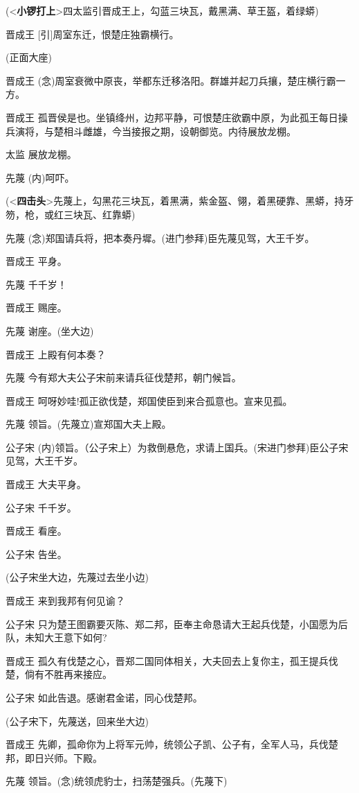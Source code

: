 (\textless{}\textbf{小锣打上}\textgreater{}四太监引晋成王上，勾蓝三块瓦，戴黑满、草王盔，着绿蟒)

晋成王 {[}引{]}周室东迁，恨楚庄独霸横行。

(正面大座)

晋成王
(念)周室衰微中原丧，举都东迁移洛阳。群雄并起刀兵攘，楚庄横行霸一方。

晋成王
孤晋侯是也。坐镇绛州，边邦平静，可恨楚庄欲霸中原，为此孤王每日操兵演将，与楚相斗雌雄，今当接报之期，设朝御览。内待展放龙棚。

太监 展放龙棚。

先蔑 (内)呵吓。

(\textless{}\textbf{四击头}\textgreater{}先蔑上，勾黑花三块瓦，着黑满，紫金盔、翎，着黑硬靠、黑蟒，持牙笏，枪，或红三块瓦、红靠蟒)

先蔑 (念)郑国请兵将，把本奏丹墀。(进门参拜)臣先蔑见驾，大王千岁。

晋成王 平身。

先蔑 千千岁！

晋成王 赐座。

先蔑 谢座。(坐大边)

晋成王 上殿有何本奏？

先蔑 今有郑大夫公子宋前来请兵征伐楚邦，朝门候旨。

晋成王 呵呀妙哇!孤正欲伐楚，郑国使臣到来合孤意也。宣来见孤。

先蔑 领旨。(先蔑立)宣郑国大夫上殿。

公子宋
(内)领旨。（公子宋上）为救倒悬危，求请上国兵。(宋进门参拜)臣公子宋见驾，大王千岁。

晋成王 大夫平身。

公子宋 千千岁。

晋成王 看座。

公子宋 告坐。

(公子宋坐大边，先蔑过去坐小边)

晋成王 来到我邦有何见谕？

公子宋
只为楚王图霸要灭陈、郑二邦，臣奉主命恳请大王起兵伐楚，小国愿为后队，未知大王意下如何?

晋成王
孤久有伐楚之心，晋郑二国同体相关，大夫回去上复你主，孤王提兵伐楚，倘有不胜再来接应。

公子宋 如此告退。感谢君金诺，同心伐楚邦。

(公子宋下，先蔑送，回来坐大边)

晋成王
先卿，孤命你为上将军元帅，统领公子凯、公子有，全军人马，兵伐楚邦，即日兴师。下殿。

先蔑 领旨。(念)统领虎豹士，扫荡楚强兵。(先蔑下)

